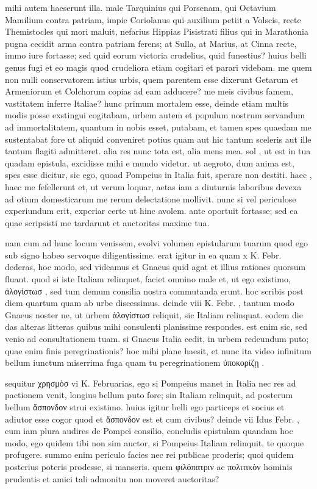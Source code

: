  mihi autem haeserunt illa. male Tarquinius qui Porsenam, qui Octavium Mamilium contra patriam, impie Coriolanus qui auxilium petiit a Volscis, recte Themistocles qui mori maluit, nefarius Hippias Pisistrati filius qui in Marathonia pugna cecidit arma contra patriam ferens; at Sulla, at Marius, at Cinna recte, immo iure fortasse; sed quid eorum victoria crudelius, quid funestius? huius belli genus fugi et eo magis quod crudeliora etiam cogitari et parari videbam. me quem non nulli conservatorem istius urbis, quem parentem esse dixerunt Getarum et Armeniorum et Colchorum copias ad eam adducere? me meis civibus famem, vastitatem inferre Italiae? hunc primum mortalem esse, deinde etiam multis modis posse exstingui cogitabam, urbem autem et populum nostrum servandum ad immortalitatem, quantum in nobis esset, putabam, et tamen spes quaedam me sustentabat fore ut aliquid conveniret potius quam aut hic tantum sceleris aut ille tantum flagiti admitteret. alia res nunc tota est, alia mens mea. sol , ut est in tua quadam epistula, excidisse mihi e mundo videtur. ut aegroto, dum anima est, spes esse dicitur, sic ego, quoad Pompeius in Italia fuit, sperare non destiti. haec , haec me fefellerunt et, ut verum loquar, aetas iam a diuturnis laboribus devexa ad otium domesticarum me rerum delectatione mollivit. nunc si vel periculose experiundum erit, experiar certe ut hinc avolem. ante oportuit fortasse; sed ea quae scripsisti me tardarunt et auctoritas maxime tua.

 nam cum ad hunc locum venissem, evolvi volumen epistularum tuarum quod ego sub signo habeo servoque diligentissime. erat igitur in ea quam x K. Febr. dederas, hoc modo, sed videamus et Gnaeus quid agat et illius rationes quorsum fluant. quod si iste Italiam relinquet, faciet omnino male et, ut ego existimo, ἀλογίστωσ , sed tum demum consilia nostra commutanda erunt. hoc scribis post diem quartum quam ab urbe discessimus. deinde viii K. Febr. , tantum modo Gnaeus noster ne, ut urbem ἀλογίστωσ reliquit, sic Italiam relinquat. eodem die das alteras litteras quibus mihi consulenti planissime respondes. est enim sic, sed venio ad consultationem tuam. si Gnaeus Italia cedit, in urbem redeundum puto; quae enim finis peregrinationis? hoc mihi plane haesit, et nunc ita video infinitum bellum iunctum miserrima fuga quam tu peregrinationem ὑποκορίζῃ .

 sequitur χρησμὸσ vi K. Februarias, ego si Pompeius manet in Italia nec res ad pactionem venit, longius bellum puto fore; sin Italiam relinquit, ad posterum bellum ἄσπονδον strui existimo. huius igitur belli ego particeps et socius et adiutor esse cogor quod et ἄσπονδον est et cum civibus? deinde vii Idus Febr. , cum iam plura audires de Pompei consilio, concludis epistulam quandam hoc modo, ego quidem tibi non sim auctor, si Pompeius Italiam relinquit, te quoque profugere. summo enim periculo facies nec rei publicae proderis; quoi quidem posterius poteris prodesse, si manseris. quem φιλόπατριν ac πολιτικὸν hominis prudentis et amici tali admonitu non moveret auctoritas?

